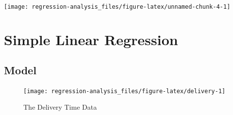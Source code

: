 \documentclass[]{book}
\newenvironment{Shaded}{\begin{snugshade}}{\end{snugshade}}
\newcommand{\DataTypeTok}[1]{\textcolor[rgb]{0.13,0.29,0.53}{#1}}
\newcommand{\FloatTok}[1]{\textcolor[rgb]{0.00,0.00,0.81}{#1}}
\newcommand{\KeywordTok}[1]{\textcolor[rgb]{0.13,0.29,0.53}{\textbf{#1}}}
\newcommand{\NormalTok}[1]{#1}
\newcommand{\OperatorTok}[1]{\textcolor[rgb]{0.81,0.36,0.00}{\textbf{#1}}}
\newcommand{\StringTok}[1]{\textcolor[rgb]{0.31,0.60,0.02}{#1}}
\theoremstyle{definition}
\theoremstyle{definition}
\theoremstyle{definition}
\theoremstyle{remark}
\begin{document}
\begin{Shaded}
\end{Shaded}

\begin{center}\texttt{[image: regression-analysis\_files/figure-latex/unnamed-chunk-4-1]} \end{center}

\hypertarget{simple}{%
\chapter{Simple Linear Regression}\label{simple}}

\hypertarget{model}{%
\section{Model}\label{model}}

\begin{Shaded}
\end{Shaded}

\begin{Shaded}
\end{Shaded}

\begin{figure}[H]

{\centering \texttt{[image: regression-analysis\_files/figure-latex/delivery-1]} 

}

\caption{The Delivery Time Data\label{fig:delivery}}\label{fig:delivery}
\end{figure}
\end{document}
